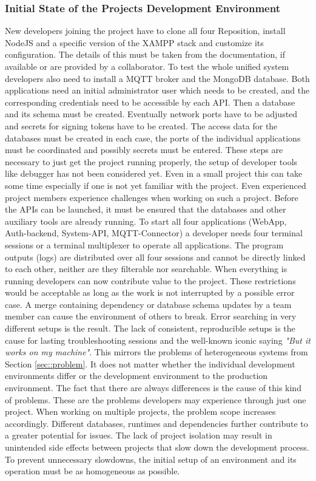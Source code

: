\documentclass[12pt, a4paper]{article}
\begin{document}
        \subsubsection{Initial State of the Projects Development Environment}
        New developers joining the project have to clone all four Reposition, install NodeJS and a specific version of the \ac{XAMPP} stack and customize its configuration. The details of this must be taken from the documentation, if available or are provided by a collaborator. To test the whole unified system developers also need to install a MQTT broker and the MongoDB database. Both applications need an initial administrator user which needs to be created, and the corresponding credentials need to be accessible by each \ac{API}. Then a database and its schema must be created. Eventually network ports have to be adjusted and secrets for signing tokens have to be created.
        The access data for the databases must be created in each case, the ports of the individual applications must be coordinated and possibly secrets must be entered. These steps are necessary to just get the project running properly, the setup of developer tools like debugger has not been considered yet. Even in a small project this can take some time especially if one is not yet familiar with the project.\newline
        Even experienced project members experience challenges when working on such a project. Before the APIs can be launched, it must be ensured that the databases and other auxiliary tools are already running. To start all four applications (WebApp, Auth-backend, System-API, MQTT-Connector) a developer needs four terminal sessions or a terminal multiplexer to operate all applications. The program outputs (logs) are distributed over all four sessions and cannot be directly linked to each other, neither are they filterable nor searchable. When everything is running developers can now contribute value to the project. These restrictions would be acceptable as long as the work is not interrupted by a possible error case. A merge containing dependency or database schema updates by a team member can cause the environment of others to break. Error searching in very different setups is the result. The lack of consistent, reproducible setups is the cause for lasting troubleshooting sessions and the well-known iconic saying \textit{"But it works on my machine"}. This mirrors the problems of heterogeneous systems from Section \ref{sec::problem}. It does not matter whether the individual development environments differ or the development environment to the production environment. The fact that there are always differences is the cause of this kind of problems. \newline
        These are the problems developers may experience through just one project. When working on multiple projects, the problem scope increases accordingly. Different databases, runtimes and dependencies further contribute to a greater potential for issues. The lack of project isolation may result in unintended side effects between projects that slow down the development process. To prevent unnecessary slowdowns, the initial setup of an environment and its operation must be as homogeneous as possible.
\end{document}
